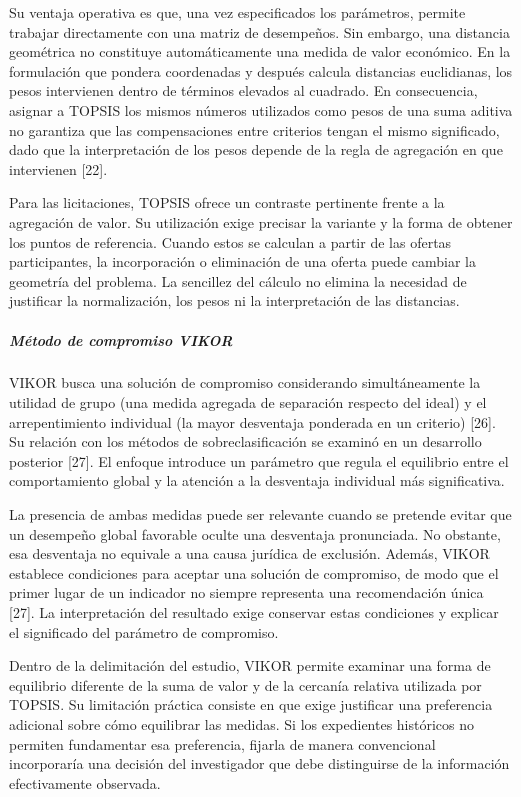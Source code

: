 \documentclass[12pt,a4paper]{article}
\begin{document}
Su ventaja operativa es que, una vez especificados los parámetros, permite trabajar directamente con una matriz de desempeños. Sin embargo, una distancia geométrica no constituye automáticamente una medida de valor económico. En la formulación que pondera coordenadas y después calcula distancias euclidianas, los pesos intervienen dentro de términos elevados al cuadrado. En consecuencia, asignar a TOPSIS los mismos números utilizados como pesos de una suma aditiva no garantiza que las compensaciones entre criterios tengan el mismo significado, dado que la interpretación de los pesos depende de la regla de agregación en que intervienen [22].

Para las licitaciones, TOPSIS ofrece un contraste pertinente frente a la agregación de valor. Su utilización exige precisar la variante y la forma de obtener los puntos de referencia. Cuando estos se calculan a partir de las ofertas participantes, la incorporación o eliminación de una oferta puede cambiar la geometría del problema. La sencillez del cálculo no elimina la necesidad de justificar la normalización, los pesos ni la interpretación de las distancias.

\subparagraph{Método de compromiso VIKOR}

VIKOR busca una solución de compromiso considerando simultáneamente la utilidad de grupo (una medida agregada de separación respecto del ideal) y el arrepentimiento individual (la mayor desventaja ponderada en un criterio) [26]. Su relación con los métodos de sobreclasificación se examinó en un desarrollo posterior [27]. El enfoque introduce un parámetro que regula el equilibrio entre el comportamiento global y la atención a la desventaja individual más significativa.

La presencia de ambas medidas puede ser relevante cuando se pretende evitar que un desempeño global favorable oculte una desventaja pronunciada. No obstante, esa desventaja no equivale a una causa jurídica de exclusión. Además, VIKOR establece condiciones para aceptar una solución de compromiso, de modo que el primer lugar de un indicador no siempre representa una recomendación única [27]. La interpretación del resultado exige conservar estas condiciones y explicar el significado del parámetro de compromiso.

Dentro de la delimitación del estudio, VIKOR permite examinar una forma de equilibrio diferente de la suma de valor y de la cercanía relativa utilizada por TOPSIS. Su limitación práctica consiste en que exige justificar una preferencia adicional sobre cómo equilibrar las medidas. Si los expedientes históricos no permiten fundamentar esa preferencia, fijarla de manera convencional incorporaría una decisión del investigador que debe distinguirse de la información efectivamente observada.
\end{document}
